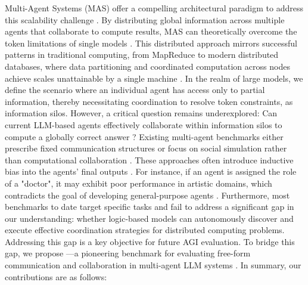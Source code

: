 Multi-Agent Systems (MAS) offer a compelling architectural paradigm to address this scalability challenge \citep{zhang2024exploring, wang2024rethinking}. 
By distributing global information across multiple agents that collaborate to compute results, MAS can theoretically overcome the token limitations of single models \cite{liuagentbench}. 
This distributed approach mirrors successful patterns in traditional computing, from MapReduce to modern distributed databases, where data partitioning and coordinated computation across nodes achieve scales unattainable by a single machine \cite{dean2008mapreduce}. 
In the realm of large models, we define the scenario where an individual agent has access only to partial information, thereby necessitating coordination to resolve token constraints, as information silos. 
However, a critical question remains underexplored: Can current LLM-based agents effectively collaborate within information silos to compute a globally correct answer \cite{qian2024chatdev,qian2023communicative,liuagentbench}? 
Existing multi-agent benchmarks either prescribe fixed communication structures \citep{li2023camel, wu2024autogen, hong2023metagpt} or focus on social simulation rather than computational collaboration \citep{park2023generative, lan2024llm}. 
These approaches often introduce inductive bias into the agents' final outputs \citep{baltaji2024conformity}. 
For instance, if an agent is assigned the role of a "doctor", it may exhibit poor performance in artistic domains, which contradicts the goal of developing general-purpose agents \cite{an2024eval,qian2024chatdev,qian2023communicative,liuagentbench}. 
Furthermore, most benchmarks to date target specific tasks \citep{deng2024mobile, chen2024llmarena, gioacchini2024agentquest} and fail to address a significant gap in our understanding: whether logic-based models can autonomously discover and execute effective coordination strategies for distributed computing problems. 
Addressing this gap is a key objective for future AGI evaluation. 
To bridge this gap, we propose \silobench{}—a pioneering benchmark for evaluating free-form communication and collaboration in multi-agent LLM systems \cite{liuagentbench}. 
In summary, our contributions are as follows:
